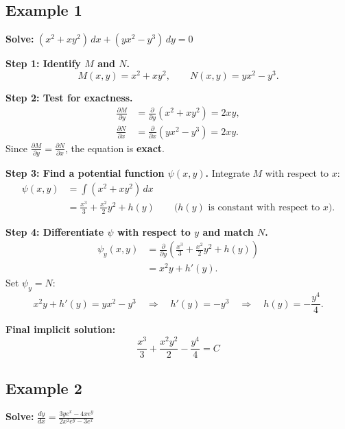 \documentclass[11pt]{article}
\begin{document}
\subsection{Example 1}

\noindent\textbf{Solve:} $(x^2+xy^2)\,dx + (yx^2-y^3)\,dy = 0$

\medskip
\noindent\textbf{Step 1: Identify $M$ and $N$.}
\[
M(x,y)=x^2+xy^2,
\qquad
N(x,y)=yx^2-y^3.
\]

\noindent\textbf{Step 2: Test for exactness.}
\begin{align*}
\frac{\partial M}{\partial y} &= \frac{\partial}{\partial y}\left(x^2+xy^2\right)=2xy,\\
\frac{\partial N}{\partial x} &= \frac{\partial}{\partial x}\left(yx^2-y^3\right)=2xy.
\end{align*}
\noindent Since $\frac{\partial M}{\partial y}=\frac{\partial N}{\partial x}$, the equation is \textbf{exact}.

\medskip
\noindent\textbf{Step 3: Find a potential function $\psi(x,y)$.}
Integrate $M$ with respect to $x$:
\begin{align*}
\psi(x,y) &= \int \left(x^2+xy^2\right)\,dx \\
          &= \frac{x^3}{3}+\frac{x^2}{2}y^2 + h(y)
          \qquad\text{($h(y)$ is constant with respect to $x$).}
\end{align*}

\noindent\textbf{Step 4: Differentiate $\psi$ with respect to $y$ and match $N$.}
\begin{align*}
\psi_y(x,y) &= \frac{\partial}{\partial y}\left(\frac{x^3}{3}+\frac{x^2}{2}y^2 + h(y)\right) \\
            &= x^2y + h'(y).
\end{align*}
Set $\psi_y = N$:
\[
x^2y+h'(y)=yx^2-y^3
\quad\Longrightarrow\quad
h'(y)=-y^3
\quad\Longrightarrow\quad
h(y)=-\frac{y^4}{4}.
\]

\noindent\textbf{Final implicit solution:}
\[
\boxed{\;\frac{x^3}{3}+\frac{x^2y^2}{2}-\frac{y^4}{4}=C\;}
\]

\subsection{Example 2}

\noindent\textbf{Solve:} $\displaystyle \frac{dy}{dx}=\frac{3ye^x-4xe^y}{2x^2e^y-3e^x}$
\end{document}
